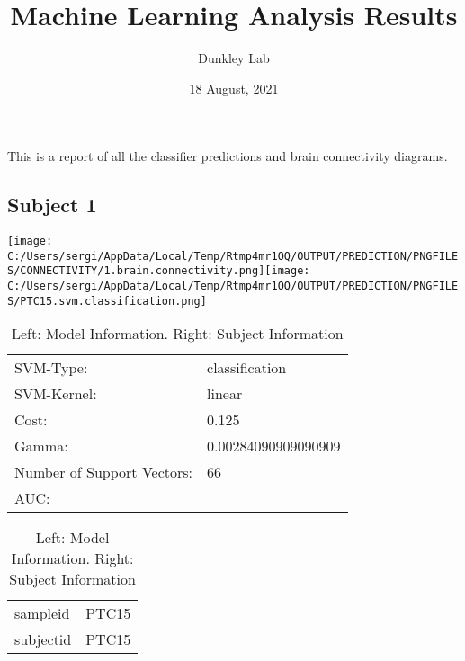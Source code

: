 \documentclass[
]{article}
\title{Machine Learning Analysis Results}
\author{Dunkley Lab}
\date{18 August, 2021}
\begin{document}
\maketitle

This is a report of all the classifier predictions and brain
connectivity diagrams.

\hypertarget{subject-1}{%
\subsection{Subject 1}\label{subject-1}}

\texttt{[image: C:/Users/sergi/AppData/Local/Temp/Rtmp4mr1OQ/OUTPUT/PREDICTION/PNGFILES/CONNECTIVITY/1.brain.connectivity.png]}\texttt{[image: C:/Users/sergi/AppData/Local/Temp/Rtmp4mr1OQ/OUTPUT/PREDICTION/PNGFILES/PTC15.svm.classification.png]}

\begin{table}[H] \centering  \caption{Left: Model Information. Right: Subject Information} 
\begin{tabular}[t]{ll}
\toprule
SVM-Type: & classification\\
SVM-Kernel: & linear\\
Cost: & 0.125\\
Gamma: & 0.00284090909090909\\
Number of Support Vectors: & 66\\
\addlinespace
AUC: & \\
\bottomrule
\end{tabular} \hspace{1cm} \centering  
\begin{tabular}[t]{ll}
\toprule
sampleid & PTC15\\
subjectid & PTC15\\
\bottomrule
\end{tabular} \end{table}

\pagebreak
\end{document}

